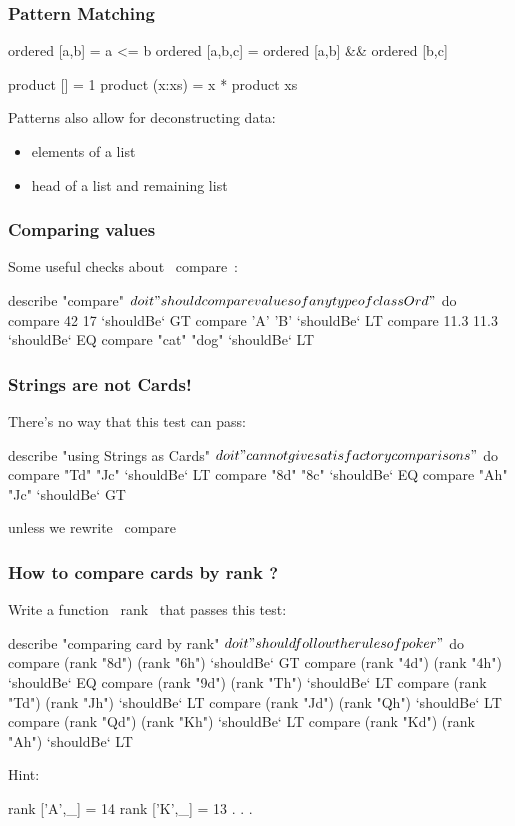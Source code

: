 \documentclass[12pt,xcolor={dvipsnames}]{beamer}
\newcommand{\vs}{\vspace{1em}}
\begin{document}
\begin{frame}[fragile]
\frametitle{Pattern Matching}
\begin{haskell}
ordered [a,b]   = a <= b
ordered [a,b,c] = ordered [a,b] && ordered [b,c]

product []     = 1
product (x:xs) = x * product xs
\end{haskell}
\vs
Patterns also allow for deconstructing data:
\begin{itemize}
\item elements of a list
\item head of a list and remaining list 
\end{itemize}
\end{frame}
\begin{frame}[fragile]
\frametitle{Comparing values}
Some useful checks about ~compare~:
\vs
\begin{hspec}
describe "compare" $ do
    it "should compare values of any type of class Ord" $ do
        compare 42 17       `shouldBe` GT
        compare 'A' 'B'     `shouldBe` LT
        compare 11.3 11.3   `shouldBe` EQ
        compare "cat" "dog" `shouldBe` LT
\end{hspec}
\end{frame}
\begin{frame}[fragile]
\frametitle{Strings are not Cards!}
There's no way that this test can pass:
\vs
\begin{hspec}
describe "using Strings as Cards" $ do
    it "cannot give satisfactory comparisons" $ do
        compare "Td" "Jc"  `shouldBe` LT
        compare "8d" "8c"  `shouldBe` EQ
        compare "Ah" "Jc"  `shouldBe` GT
\end{hspec}
\vs
unless we rewrite ~compare~ 
\end{frame}
\begin{frame}[fragile]
\frametitle{How to compare cards by rank ?}
Write a function ~rank~ that passes this test:
\vs
\begin{hspec}
describe "comparing card by rank" $ do
    it "should follow the rules of poker" $ do
        compare (rank "8d") (rank "6h") `shouldBe` GT
        compare (rank "4d") (rank "4h") `shouldBe` EQ
        compare (rank "9d") (rank "Th") `shouldBe` LT 
        compare (rank "Td") (rank "Jh") `shouldBe` LT 
        compare (rank "Jd") (rank "Qh") `shouldBe` LT 
        compare (rank "Qd") (rank "Kh") `shouldBe` LT 
        compare (rank "Kd") (rank "Ah") `shouldBe` LT 
\end{hspec}
Hint:
\begin{haskell}
rank ['A',_] = 14
rank ['K',_] = 13
    . . .
\end{haskell}
\end{frame}
\end{document}
